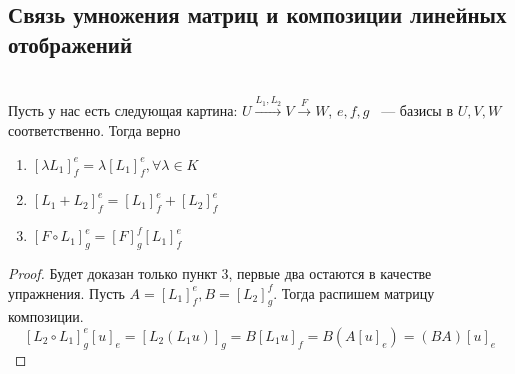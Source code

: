 \subsection{Связь умножения матриц и композиции линейных отображений}
\begin{statement}\leavevmode\\
    Пусть у нас есть следующая картина: $U\xrightarrow{L_1, L_2} V \xrightarrow{F} W$, $e, f, g$ 
    ~--- базисы в $U, V, W$ соответственно. Тогда верно
    \begin{enumerate}
        \item $[\lambda L_1]^e_f=\lambda[L_1]^e_f, \forall \lambda\in K$ 
        \item $[L_1 + L_2]^e_f = [L_1]^e_f + [L_2]^e_f$ 
        \item $[F\circ L_1]^e_g = [F]^f_g[L_1]^e_f$
    \end{enumerate}
\end{statement}
\begin{proof}
    Будет доказан только пункт 3, первые два остаются в качестве упражнения.
    Пусть $A = [L_1]^e_f, B = [L_2]^f_g$. Тогда распишем матрицу композиции.
    \[
        [L_2\circ L_1]^e_g[u]_e= [L_2(L_1u)]_g = B[L_1u]_f = B(A[u]_e) = (BA)[u]_e
    \]
\end{proof}

